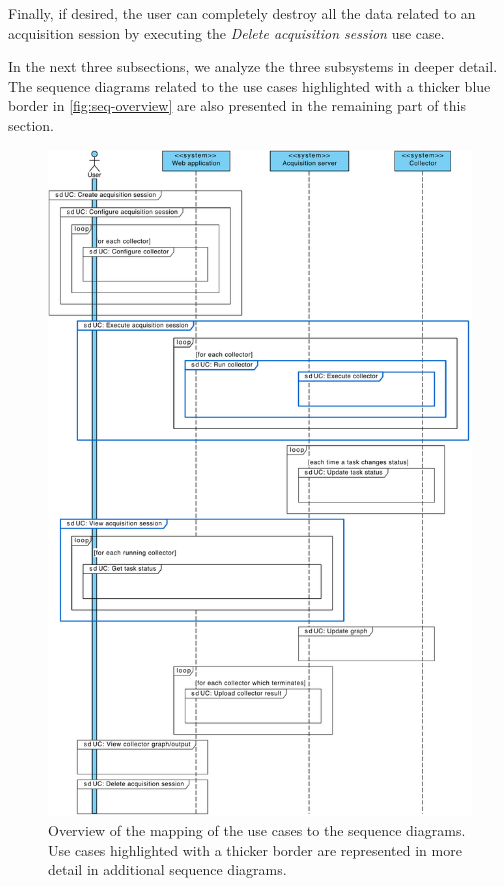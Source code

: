 Finally, if desired, the user can completely destroy all the data related to an acquisition session by executing the \emph{Delete acquisition session} use case.

In the next three subsections, we analyze the three subsystems in deeper detail. The sequence diagrams related to the use cases highlighted with a thicker blue border in \vref{fig:seq-overview} are also presented in the remaining part of this section.

\begin{figure}
  \centering
  \includegraphics[width=0.95\linewidth]{images/diagrams/seq-overview}
  \caption[Overview of the mapping of the use cases to the sequence diagrams.]{Overview of the mapping of the use cases to the sequence diagrams. Use cases highlighted with a thicker border are represented in more detail in additional sequence diagrams.}
  \label{fig:seq-overview}
\end{figure}


